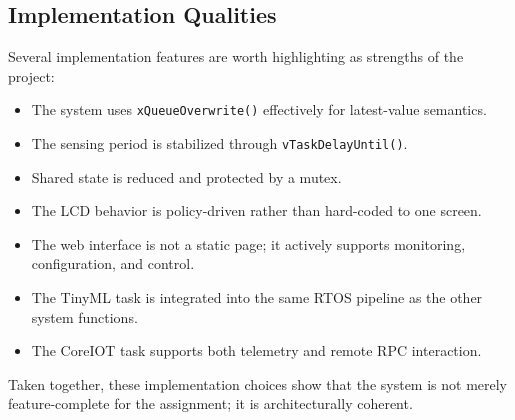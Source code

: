 \subsection{Implementation Qualities}
Several implementation features are worth highlighting as strengths of the
project:
\begin{itemize}
  \item The system uses \texttt{xQueueOverwrite()} effectively for latest-value
  semantics.
  \item The sensing period is stabilized through \texttt{vTaskDelayUntil()}.
  \item Shared state is reduced and protected by a mutex.
  \item The LCD behavior is policy-driven rather than hard-coded to one screen.
  \item The web interface is not a static page; it actively supports monitoring,
  configuration, and control.
  \item The TinyML task is integrated into the same RTOS pipeline as the other
  system functions.
  \item The CoreIOT task supports both telemetry and remote RPC interaction.
\end{itemize}

Taken together, these implementation choices show that the system is not merely
feature-complete for the assignment; it is architecturally coherent.
